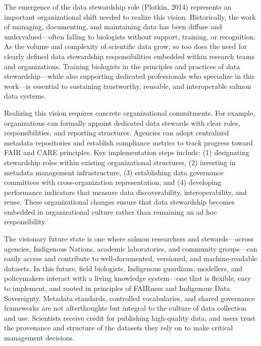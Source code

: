 \documentclass[
  letterpaper,
  DIV=11,
  numbers=noendperiod]{scrartcl}
\begin{document}
The emergence of the data stewardship role (Plotkin, 2014) represents an
important organizational shift needed to realize this vision.
Historically, the work of managing, documenting, and maintaining data
has been diffuse and undervalued---often falling to biologists without
support, training, or recognition. As the volume and complexity of
scientific data grow, so too does the need for clearly defined data
stewardship responsibilities embedded within research teams and
organizations. Training biologists in the principles and practices of
data stewardship---while also supporting dedicated professionals who
specialize in this work---is essential to sustaining trustworthy,
reusable, and interoperable salmon data systems.

Realizing this vision requires concrete organizational commitments. For
example, organizations can formally appoint dedicated data stewards with
clear roles, responsibilities, and reporting structures. Agencies can
adopt centralized metadata repositories and establish compliance metrics
to track progress toward FAIR and CARE principles. Key implementation
steps include: (1) designating stewardship roles within existing
organizational structures, (2) investing in metadata management
infrastructure, (3) establishing data governance committees with
cross-organization representation, and (4) developing performance
indicators that measure data discoverability, interoperability, and
reuse. These organizational changes ensure that data stewardship becomes
embedded in organizational culture rather than remaining an ad hoc
responsibility.

The visionary future state is one where salmon researchers and
stewards---across agencies, Indigenous Nations, academic laboratories,
and community groups---can easily access and contribute to
well-documented, versioned, and machine-readable datasets. In this
future, field biologists, Indigenous guardians, modellers, and
policymakers interact with a living knowledge system---one that is
flexible, easy to implement, and rooted in principles of FAIRness and
Indigenous Data Sovereignty. Metadata standards, controlled
vocabularies, and shared governance frameworks are not afterthoughts but
integral to the culture of data collection and use. Scientists receive
credit for publishing high-quality data, and users trust the provenance
and structure of the datasets they rely on to make critical management
decisions.
\end{document}

